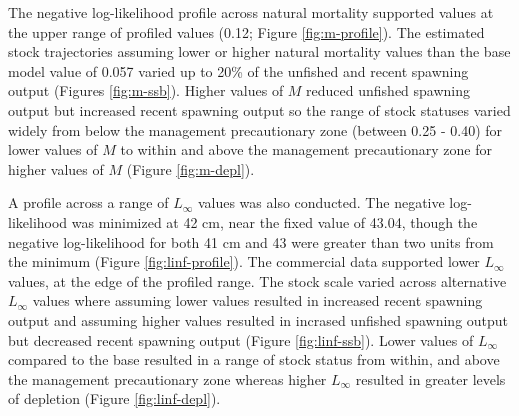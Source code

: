 \documentclass[11pt,
  english,
  a4paper,
]{article}
\begin{document}
\leavevmode\tagmcend\tagstructend\par


The negative log-likelihood profile across natural mortality supported values at the upper range of profiled values (0.12; Figure \ref{fig:m-profile}). The estimated stock trajectories assuming lower or higher natural mortality values than the base model value of 0.057 varied up to 20\% of the unfished and recent spawning output (Figures \ref{fig:m-ssb}). Higher values of {\(M\)\leavevmode\tagmcend\tagstructend} reduced unfished spawning output but increased recent spawning output so the range of stock statuses varied widely from below the management precautionary zone (between 0.25 - 0.40) for lower values of {\(M\)\leavevmode\tagmcend\tagstructend} to within and above the management precautionary zone for higher values of {\(M\)\leavevmode\tagmcend\tagstructend} (Figure \ref{fig:m-depl}).

\leavevmode\tagmcend\tagstructend\par


A profile across a range of {\(L_{\infty}\)\leavevmode\tagmcend\tagstructend} values was also conducted. The negative log-likelihood was minimized at 42 cm, near the fixed value of 43.04, though the negative log-likelihood for both 41 cm and 43 were greater than two units from the minimum (Figure \ref{fig:linf-profile}). The commercial data supported lower {\(L_{\infty}\)\leavevmode\tagmcend\tagstructend} values, at the edge of the profiled range. The stock scale varied across alternative {\(L_{\infty}\)\leavevmode\tagmcend\tagstructend} values where assuming lower values resulted in increased recent spawning output and assuming higher values resulted in incrased unfished spawning output but decreased recent spawning output (Figure \ref{fig:linf-ssb}). Lower values of {\(L_{\infty}\)\leavevmode\tagmcend\tagstructend} compared to the base resulted in a range of stock status from within, and above the management precautionary zone whereas higher {\(L_{\infty}\)\leavevmode\tagmcend\tagstructend} resulted in greater levels of depletion (Figure \ref{fig:linf-depl}).
\end{document}
